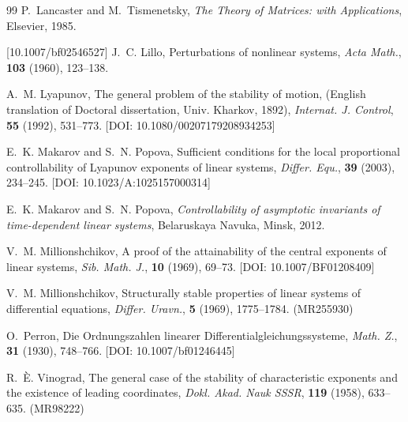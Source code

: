\documentclass[11pt]{article}
\begin{document}
\begin{thebibliography}{99}
\newblock P.~Lancaster and M.~Tismenetsky,
\newblock \emph{The Theory of Matrices: with Applications},
\newblock Elsevier, 1985.

 [10.1007/bf02546527]
\newblock J.~C. Lillo,
\newblock Perturbations of nonlinear systems,
\newblock \emph{Acta Math.}, \textbf{103} (1960), 123--138.
\fi

\newblock A.~M. Lyapunov,
\newblock The general problem of the stability of motion, ({English}
  translation of {Doctoral} dissertation, {Univ.} {Kharkov}, 1892),
\newblock \emph{Internat. J. Control}, \textbf{55} (1992), 531--773. [DOI: 10.1080/00207179208934253]

\newblock E.~K. Makarov and S.~N. Popova,
\newblock Sufficient conditions for the local proportional controllability of
  {Lyapunov} exponents of linear systems,
\newblock \emph{Differ. Equ.}, \textbf{39} (2003), 234--245. [DOI: 10.1023/A:1025157000314]


\newblock E.~K. Makarov and S.~N. Popova,
\newblock \emph{Controllability of asymptotic invariants of time-dependent linear systems},
\newblock Belaruskaya Navuka, Minsk, 2012.



\newblock V.~M. Millionshchikov,
\newblock A proof of the attainability of the central exponents of linear
  systems,
\newblock \emph{Sib. Math. J.}, \textbf{10} (1969), 69--73. [DOI: 10.1007/BF01208409]

\newblock V.~M. Millionshchikov,
\newblock Structurally stable properties of linear systems of differential
  equations,
\newblock \emph{Differ. Uravn.}, \textbf{5} (1969), 1775--1784. (MR255930)

\newblock O.~Perron,
\newblock Die Ordnungszahlen linearer Differentialgleichungssysteme,
\newblock \emph{Math. Z.}, \textbf{31} (1930), 748--766. [DOI: 10.1007/bf01246445]

\newblock R.~{\`E}. Vinograd,
\newblock The general case of the stability of characteristic exponents and the
  existence of leading coordinates,
\newblock \emph{Dokl. Akad. Nauk SSSR}, \textbf{119} (1958), 633--635. (MR98222)
\fi


\end{thebibliography}
\end{document}
